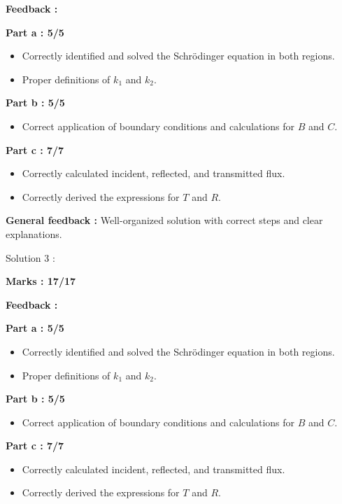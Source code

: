 \documentclass[a4paper,11pt]{article}
\begin{document}
\textbf{Feedback :}

\textbf{Part a : 5/5}

\begin{itemize}
    \item Correctly identified and solved the Schrödinger equation in both regions.
    \item Proper definitions of $k_1$ and $k_2$.
\end{itemize}

\textbf{Part b : 5/5}

\begin{itemize}
    \item Correct application of boundary conditions and calculations for $B$ and $C$.
\end{itemize}

\textbf{Part c : 7/7}

\begin{itemize}
    \item Correctly calculated incident, reflected, and transmitted flux.
    \item Correctly derived the expressions for $T$ and $R$.
\end{itemize}

\textbf{General feedback :}
Well-organized solution with correct steps and clear explanations.

Solution 3 :

\textbf{Marks : 17/17}

\textbf{Feedback :}

\textbf{Part a : 5/5}

\begin{itemize}
    \item Correctly identified and solved the Schrödinger equation in both regions.
    \item Proper definitions of $k_1$ and $k_2$.
\end{itemize}

\textbf{Part b : 5/5}

\begin{itemize}
    \item Correct application of boundary conditions and calculations for $B$ and $C$.
\end{itemize}

\textbf{Part c : 7/7}

\begin{itemize}
    \item Correctly calculated incident, reflected, and transmitted flux.
    \item Correctly derived the expressions for $T$ and $R$.
\end{itemize}
\end{document}
